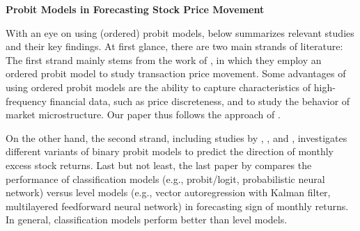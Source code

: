 \par
{\noindent\bfseries Probit Models in Forecasting Stock Price Movement}


With an eye on using (ordered) probit models,  below summarizes relevant studies and their key findings. At first glance, there are two main strands of literature: The first strand mainly stems from the work of \citet{hausman1992}, in which they employ an ordered probit model to study transaction price movement. Some advantages of using ordered probit models are the ability to capture characteristics of high-frequency financial data, such as price discreteness, and to study the behavior of market microstructure. Our paper thus follows the approach of \citet{hausman1992}.  

On the other hand, the second strand, including studies by \citet{nyberg2011}, \citet{nybergponka2016}, and \citet{ponka2017}, investigates different variants of binary probit models to predict the direction of monthly excess stock returns. Last but not least, the last paper by \citet{leungetal2000} compares the performance of classification models (e.g., probit/logit, probabilistic neural network) versus level models (e.g., vector autoregression with Kalman filter, multilayered feedforward neural network) in forecasting sign of monthly returns. In general, classification models perform better than level models. 



